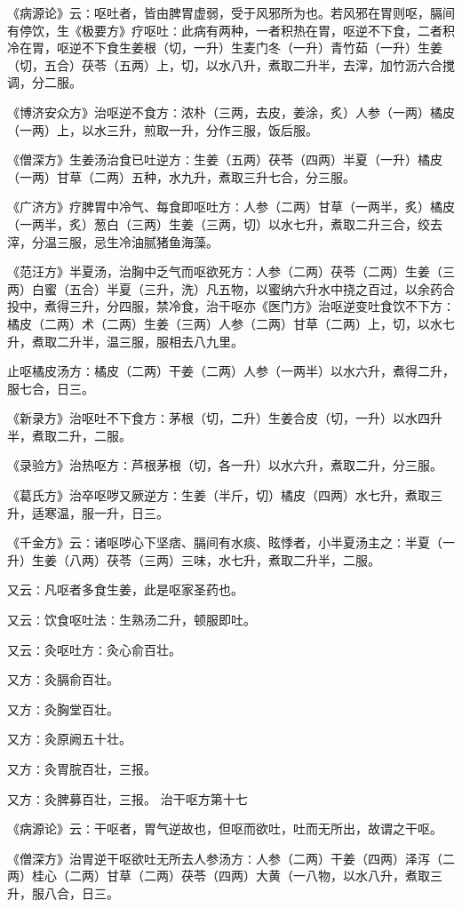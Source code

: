 \documentclass[a4paper,12pt,UTF8,twoside]{ctexbook}
\begin{document}
《病源论》云∶呕吐者，皆由脾胃虚弱，受于风邪所为也。若风邪在胃则呕，膈间有停饮，生《极要方》疗呕吐∶此病有两种，一者积热在胃，呕逆不下食，二者积冷在胃，呕逆不下食生姜根（切，一升）生麦门冬（一升）青竹茹（一升）生姜（切，五合）茯苓（五两）上，切，以水八升，煮取二升半，去滓，加竹沥六合搅调，分二服。

《博济安众方》治呕逆不食方∶浓朴（三两，去皮，姜涂，炙）人参（一两）橘皮（一两）上，以水三升，煎取一升，分作三服，饭后服。

《僧深方》生姜汤治食已吐逆方∶生姜（五两）茯苓（四两）半夏（一升）橘皮（一两）甘草（二两）五种，水九升，煮取三升七合，分三服。

《广济方》疗脾胃中冷气、每食即呕吐方∶人参（二两）甘草（一两半，炙）橘皮（一两半，炙）葱白（三两）生姜（三两，切）以水七升，煮取二升三合，绞去滓，分温三服，忌生冷油腻猪鱼海藻。

《范汪方》半夏汤，治胸中乏气而呕欲死方∶人参（二两）茯苓（二两）生姜（三两）白蜜（五合）半夏（三升，洗）凡五物，以蜜纳六升水中挠之百过，以余药合投中，煮得三升，分四服，禁冷食，治干呕亦《医门方》治呕逆变吐食饮不下方∶橘皮（二两）术（二两）生姜（三两）人参（二两）甘草（二两）上，切，以水七升，煮取二升半，温三服，服相去八九里。

止呕橘皮汤方∶橘皮（二两）干姜（二两）人参（一两半）以水六升，煮得二升，服七合，日三。

《新录方》治呕吐不下食方∶茅根（切，二升）生姜合皮（切，一升）以水四升半，煮取二升，二服。

《录验方》治热呕方∶芦根茅根（切，各一升）以水六升，煮取二升，分三服。

《葛氏方》治卒呕哕又厥逆方∶生姜（半斤，切）橘皮（四两）水七升，煮取三升，适寒温，服一升，日三。

《千金方》云∶诸呕哕心下坚痞、膈间有水痰、眩悸者，小半夏汤主之∶半夏（一升）生姜（八两）茯苓（三两）三味，水七升，煮取二升半，二服。

又云∶凡呕者多食生姜，此是呕家圣药也。

又云∶饮食呕吐法∶生熟汤二升，顿服即吐。

又云∶灸呕吐方∶灸心俞百壮。

又方∶灸膈俞百壮。

又方∶灸胸堂百壮。

又方∶灸原阙五十壮。

又方∶灸胃脘百壮，三报。

又方∶灸脾募百壮，三报。
治干呕方第十七

《病源论》云∶干呕者，胃气逆故也，但呕而欲吐，吐而无所出，故谓之干呕。

《僧深方》治胃逆干呕欲吐无所去人参汤方∶人参（二两）干姜（四两）泽泻（二两）桂心（二两）甘草（二两）茯苓（四两）大黄（一八物，以水八升，煮取三升，服八合，日三。
\end{document}
